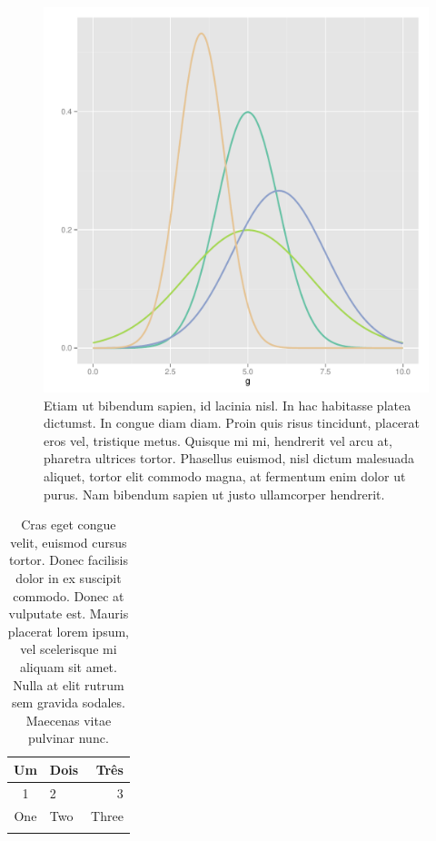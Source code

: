 \begin{figure}[htb]
  \centering
  \includegraphics[scale=0.45]{figuras/distributions.pdf}
  \caption{Etiam ut bibendum sapien, id lacinia nisl. In hac
    habitasse platea dictumst. In congue diam diam. Proin quis risus
    tincidunt, placerat eros vel, tristique metus. Quisque mi mi,
    hendrerit vel arcu at, pharetra ultrices tortor. Phasellus
    euismod, nisl dictum malesuada aliquet, tortor elit commodo magna,
    at fermentum enim dolor ut purus. Nam bibendum sapien ut justo
    ullamcorper hendrerit.}
  \label{fig:2}
\end{figure}


\begin{table}
\centering
\caption{Cras eget congue velit, euismod cursus tortor. Donec
  facilisis dolor in ex suscipit commodo. Donec at vulputate est.
  Mauris placerat lorem ipsum, vel scelerisque mi aliquam sit amet.
  Nulla at elit rutrum sem gravida sodales. Maecenas vitae pulvinar
  nunc.}
\begin{tabular}{clr} 
\hline
Um & Dois & Três\\
\hline
1 & 2 & 3 \\
One & Two & Three\\
\hline
\label{Tab:result}
\end{tabular}
\end{table}


